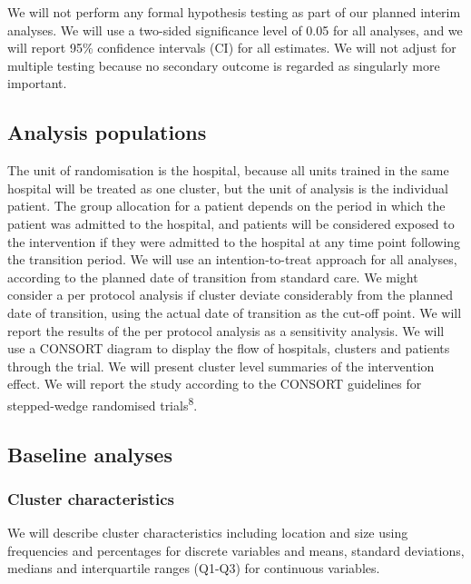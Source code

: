 \documentclass[
]{scrartcl}
\begin{document}
We will not perform any formal hypothesis testing as part of our planned
interim analyses. We will use a two-sided significance level of 0.05 for
all analyses, and we will report 95\% confidence intervals (CI) for all
estimates. We will not adjust for multiple testing because no secondary
outcome is regarded as singularly more important.

\hypertarget{analysis-populations}{%
\subsection{Analysis populations}\label{analysis-populations}}

The unit of randomisation is the hospital, because all units trained in
the same hospital will be treated as one cluster, but the unit of
analysis is the individual patient. The group allocation for a patient
depends on the period in which the patient was admitted to the hospital,
and patients will be considered exposed to the intervention if they were
admitted to the hospital at any time point following the transition
period. We will use an intention-to-treat approach for all analyses,
according to the planned date of transition from standard care. We might
consider a per protocol analysis if cluster deviate considerably from
the planned date of transition, using the actual date of transition as
the cut-off point. We will report the results of the per protocol
analysis as a sensitivity analysis. We will use a CONSORT diagram to
display the flow of hospitals, clusters and patients through the trial.
We will present cluster level summaries of the intervention effect. We
will report the study according to the CONSORT guidelines for
stepped-wedge randomised trials\textsuperscript{8}.

\hypertarget{baseline-analyses}{%
\subsection{Baseline analyses}\label{baseline-analyses}}

\hypertarget{cluster-characteristics}{%
\subsubsection{Cluster characteristics}\label{cluster-characteristics}}

We will describe cluster characteristics including location and size
using frequencies and percentages for discrete variables and means,
standard deviations, medians and interquartile ranges (Q1-Q3) for
continuous variables.
\end{document}
